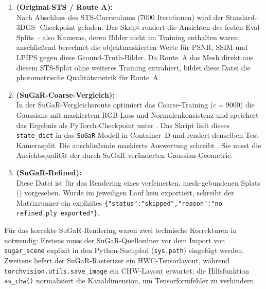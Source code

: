 \begin{enumerate}
  \item \textbf{ (Original-STS / Route A):}\\
        Nach Abschluss des STS-Curriculums (7000 Iterationen) wird der Standard-3DGS-
        Checkpoint  geladen. Das
        Skript  rendert die Ansichten des festen
        Eval-Splits -- also Kameras, deren Bilder nicht im Training enthalten
        waren; anschließend berechnet  die
        objektmaskierten Werte für PSNR, SSIM und LPIPS gegen diese
        Ground-Truth-Bilder.
        Da Route~A das Mesh direkt aus diesem STS-Splat ohne weiteres Training
        extrahiert, bildet diese Datei die photometrische Qualitätsmetrik für Route~A.
  \item \textbf{ (SuGaR-Coarse-Vergleich):}\\
        In der SuGaR-Vergleichsroute optimiert das Coarse-Training ($c=9000$) die
        Gaussians mit maskiertem RGB-Loss und Normalenkonsistenz und speichert das
        Ergebnis als PyTorch-Checkpoint unter
        . Das Skript
         lädt dieses \texttt{state\_dict}
        in das \texttt{SuGaR}-Modell in Container~D und rendert denselben
        Test-Kamerasplit. Die anschließende maskierte Auswertung schreibt
        . Sie misst die Ansichtsqualität der durch
        SuGaR veränderten Gaussian-Geometrie.
  \item \textbf{ (SuGaR-Refined):}\\
        Diese Datei ist für das Rendering eines verfeinerten, mesh-gebundenen Splats
        () vorgesehen. Wurde im jeweiligen Lauf kein
         exportiert, schreibt der Matrixrunner ein explizites
        \texttt{\{\string"status\string":\string"skipped\string",\string"reason\string":\string"no refined.ply exported\string"\}}.
\end{enumerate}

Für das korrekte SuGaR-Rendering waren zwei technische Korrekturen in
 notwendig: Erstens muss der SuGaR-Quellordner
 vor dem Import von \texttt{sugar\_scene} explizit in den
Python-Suchpfad (\texttt{sys.path}) eingefügt werden. Zweitens liefert der
SuGaR-Rasterizer ein HWC-Tensorlayout, während \texttt{torchvision.utils.save\_image}
ein CHW-Layout erwartet; die Hilfsfunktion \texttt{as\_chw()} normalisiert die
Kanaldimension, um Tensorformfehler zu verhindern.

